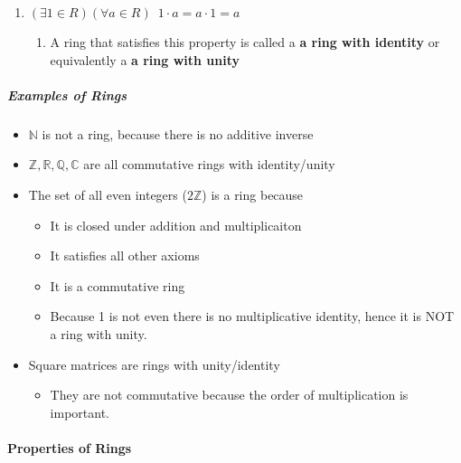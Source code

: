 \documentclass[
]{article}
\begin{document}
\begin{enumerate}
\begin{enumerate}
    \begin{enumerate}
    \def\labelenumiii{\arabic{enumiii}.}
    \item
      \((\exists1 \in R) (\forall a \in R) \enspace 1 \cdot a = a \cdot 1 = a\)

      \begin{enumerate}
      \def\labelenumiv{\arabic{enumiv}.}
      \item
        A ring that satisfies this property is called a \textbf{a ring
        with identity} or equivalently a \textbf{a ring with unity}
      \end{enumerate}
    \end{enumerate}
  \end{enumerate}

  \hypertarget{header-n757}{%
  \subparagraph{Examples of Rings}\label{header-n757}}

  \begin{itemize}
  \item
    \(\mathbb{N}\) is not a ring, because there is no additive inverse
  \item
    \(\mathbb{Z}, \mathbb{R}, \mathbb{Q}, \mathbb{C}\) are all
    commutative rings with identity/unity
  \item
    The set of all even integers (\(2\mathbb{Z}\)) is a ring because

    \begin{itemize}
    \item
      It is closed under addition and multiplicaiton
    \item
      It satisfies all other axioms
    \item
      It is a commutative ring
    \item
      Because 1 is not even there is no multiplicative identity, hence
      it is NOT a ring with unity.
    \end{itemize}
  \item
    Square matrices are rings with unity/identity

    \begin{itemize}
    \item
      They are not commutative because the order of multiplication is
      important.
    \end{itemize}
  \end{itemize}

  \hypertarget{header-n780}{%
  \paragraph{Properties of Rings}\label{header-n780}}


\end{enumerate}
\end{document}
